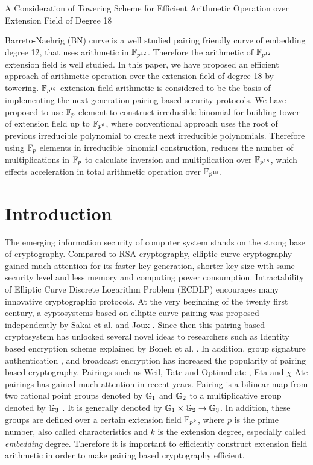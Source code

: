 A Consideration of Towering Scheme for Efficient Arithmetic Operation over Extension Field of Degree 18

Barreto-Naehrig (BN) curve is a well studied pairing friendly curve of embedding degree 12, that uses arithmetic in $\mathbb{F}_{p^{12}}$. Therefore the arithmetic of $\mathbb{F}_{p^{12}}$ extension field is well studied. In this paper, we have proposed an efficient approach of arithmetic operation over the extension field of degree 18 by towering. $\mathbb{F}_{p^{18}}$ extension field arithmetic is considered to be the basis of implementing the next generation pairing based security protocols. We have proposed to use $\mathbb{F}_p$ element to construct irreducible binomial for building tower of extension field up to $\mathbb{F}_{p^6}$, where conventional approach uses the root of previous irreducible polynomial to create next irreducible polynomials. Therefore using $\mathbb{F}_p$ elements in irreducible binomial construction, reduces the number of multiplications in $\mathbb{F}_p$ to calculate inversion and multiplication over $\mathbb{F}_{p^{18}}$, which effects acceleration in total arithmetic operation over $\mathbb{F}_{p^{18}}$.



\section{Introduction}
The emerging information security of computer system stands on the strong base of cryptography. Compared to RSA cryptography, elliptic curve cryptography \cite{ECC_Kob} gained much attention for its faster key generation, shorter key size with same security level and less memory and computing power consumption. Intractability of Elliptic Curve Discrete Logarithm Problem (ECDLP) encourages many innovative cryptographic protocols. At the very beginning of the twenty first century, a cyptosystems based on elliptic curve pairing was proposed independently by Sakai et al. \cite{EPRINT:SakKas03} and Joux \cite{joux}. Since then this pairing based cryptosystem has unlocked several novel ideas to researchers such as Identity based encryption scheme explained by Boneh et al. \cite{C:BonFra01}. In addition, group signature authentication \cite{group_sign_1},\cite{group_sign_2} and broadcast encryption \cite{boradcast} has increased the popularity of pairing based cryptography. Pairings such as Weil\cite{Weil_p}, Tate and Optimal-ate \cite{op_ate_p}, Eta \cite{IEEETIT:HesSmaVer06} and $\chi$-Ate \cite{PAIRING:NASKM08} pairings has gained much attention in recent years. Pairing is a bilinear map from two rational point groups denoted by ${\mathbb{G}}_{1}$ and ${\mathbb{G}}_{2}$ to a multiplicative group denoted by ${\mathbb{G}}_{3}$ \cite{Silverman}. It is generally denoted by ${\mathbb{G}}_{1} \times {\mathbb{G}}_{2} \rightarrow {\mathbb{G}}_{3}$. In addition, these groups are defined over a certain extension field $\mathbb{F}_{p^k}$, where $p$ is the prime number, also called characteristics  and $k$ is the extension degree, especially called \textit{embedding} degree. 
Therefore it is important to efficiently construct extension field arithmetic in order to make pairing based cryptography efficient.

